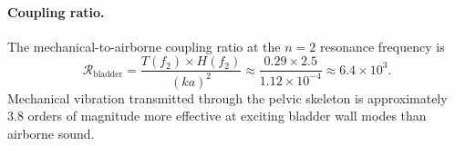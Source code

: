 \paragraph{Coupling ratio.}
The mechanical-to-airborne coupling ratio at the $n = 2$ resonance frequency is
\begin{equation}\label{eq:R_coupling}
  \mathcal{R}_\mathrm{bladder} = \frac{T(f_2) \times H(f_2)}{(ka)^2}
  \approx \frac{0.29 \times 2.5}{1.12 \times 10^{-4}}
  \approx 6.4 \times 10^3.
\end{equation}
Mechanical vibration transmitted through the pelvic skeleton is approximately
$3.8$ orders of magnitude more effective at exciting bladder wall modes than
airborne sound.
